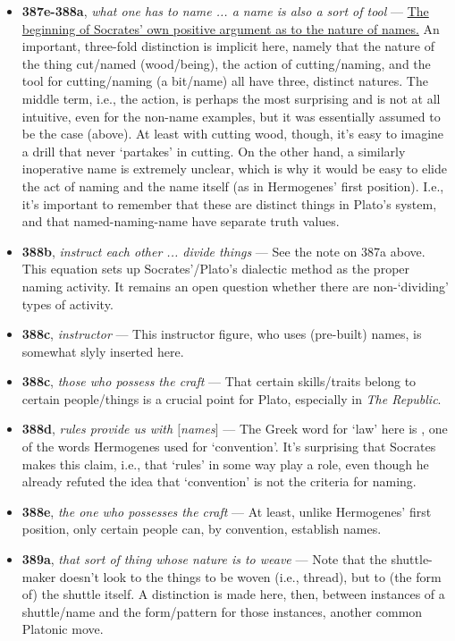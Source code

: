\documentclass[12pt]{article}
\begin{document}
\begin{itemize}
\item \textbf{387e-388a}, \textit{what one has to name ... a name is also a sort of tool} --- \ul{The beginning of Socrates' own positive argument as to the nature of names.} An important, three-fold distinction is implicit here, namely that the nature of the thing cut/named (wood/being), the action of cutting/naming, and the tool for cutting/naming (a bit/name) all have three, distinct natures. The middle term, i.e., the action, is perhaps the most surprising and is not at all intuitive, even for the non-name examples, but it was essentially assumed to be the case (above). At least with cutting wood, though, it's easy to imagine a drill that never `partakes' in cutting. On the other hand, a similarly inoperative name is extremely unclear, which is why it would be easy to elide the act of naming and the name itself (as in Hermogenes' first position). I.e., it's important to remember that these are distinct things in Plato's system, and that named-naming-name have separate truth values.

\item \textbf{388b}, \textit{instruct each other ... divide things} --- See the note on 387a above. This equation sets up Socrates'/Plato's dialectic method as the proper naming activity. It remains an open question whether there are non-`dividing' types of activity.

\item \textbf{388c}, \textit{instructor} --- This instructor figure, who uses (pre-built) names, is somewhat slyly inserted here.

\item \textbf{388c}, \textit{those who possess the craft} --- That certain skills/traits belong to certain people/things is a crucial point for Plato, especially in \textit{The Republic}.

\item \textbf{388d}, \textit{rules provide us with $[$names$]$} --- The Greek word for `law' here is , one of the words Hermogenes used for `convention'. It's surprising that Socrates makes this claim, i.e., that `rules' in some way play a role, even though he already refuted the idea that `convention' is not the criteria for naming.

\item \textbf{388e}, \textit{the one who possesses the craft} --- At least, unlike Hermogenes' first position, only certain people can, by convention, establish names.

\item \textbf{389a}, \textit{that sort of thing whose nature is to weave} --- Note that the shuttle-maker doesn't look to the things to be woven (i.e., thread), but to (the form of) the shuttle itself. A distinction is made here, then, between instances of a shuttle/name and the form/pattern for those instances, another common Platonic move.


\end{itemize}
\end{document}
